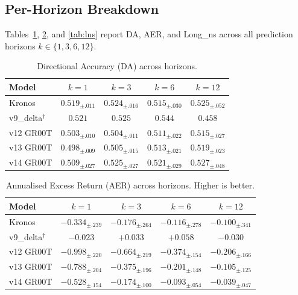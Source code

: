 \documentclass[11pt,a4paper]{article}
\newcommand{\best}[1]{\textcolor{bestblue}{\textbf{#1}}}
\newcommand{\refmark}{$^\dagger$}
\begin{document}
\subsection{Per-Horizon Breakdown}

Tables~\ref{tab:da}, \ref{tab:aer}, and \ref{tab:lns} report DA, AER, and Long\_ns across all prediction horizons $k \in \{1, 3, 6, 12\}$.

\begin{table}[h]
\centering
\caption{Directional Accuracy (DA) across horizons.}
\label{tab:da}
\renewcommand{\arraystretch}{1.2}
\begin{tabular}{lcccc}
\toprule
\textbf{Model} & $k=1$ & $k=3$ & $k=6$ & $k=12$ \\
\midrule
\rowcolor{lightgray}
Kronos            & $0.519_{\pm.011}$ & $0.524_{\pm.016}$ & $0.515_{\pm.030}$ & $0.525_{\pm.052}$ \\
v9\_delta\refmark & $0.521$           & $0.525$           & $0.544$           & $0.458$           \\
v12 GR00T         & $0.503_{\pm.010}$ & $0.504_{\pm.011}$ & $0.511_{\pm.022}$ & $0.515_{\pm.027}$ \\
v13 GR00T         & $0.498_{\pm.009}$ & $0.505_{\pm.015}$ & $0.513_{\pm.021}$ & $0.519_{\pm.023}$ \\
v14 GR00T         & \best{$0.509_{\pm.027}$} & \best{$0.525_{\pm.027}$} & \best{$0.521_{\pm.029}$} & \best{$0.527_{\pm.048}$} \\
\bottomrule
\end{tabular}
\end{table}

\begin{table}[h]
\centering
\caption{Annualised Excess Return (AER) across horizons. Higher is better.}
\label{tab:aer}
\renewcommand{\arraystretch}{1.2}
\begin{tabular}{lcccc}
\toprule
\textbf{Model} & $k=1$ & $k=3$ & $k=6$ & $k=12$ \\
\midrule
\rowcolor{lightgray}
Kronos            & $-0.334_{\pm.239}$ & $-0.176_{\pm.264}$ & $-0.116_{\pm.278}$ & $-0.100_{\pm.341}$ \\
v9\_delta\refmark & $-0.023$           & $+0.033$           & $+0.058$           & $-0.030$           \\
v12 GR00T         & $-0.998_{\pm.220}$ & $-0.664_{\pm.219}$ & $-0.374_{\pm.154}$ & $-0.206_{\pm.166}$ \\
v13 GR00T         & $-0.788_{\pm.204}$ & $-0.375_{\pm.196}$ & $-0.201_{\pm.148}$ & $-0.105_{\pm.125}$ \\
v14 GR00T         & \best{$-0.528_{\pm.154}$} & \best{$-0.174_{\pm.100}$} & \best{$-0.093_{\pm.054}$} & \best{$-0.039_{\pm.047}$} \\
\bottomrule
\end{tabular}
\end{table}
\end{document}
